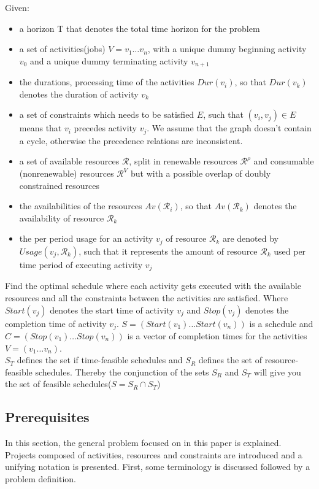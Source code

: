 \documentclass{article}
\begin{document}
Given:
\begin{itemize}
\item a horizon T that denotes the total time horizon for the problem
\item a set of activities(jobs) $V = v_1 \ldots v_n$, with a unique dummy beginning activity $v_0$ and a unique dummy terminating activity $v_{n+1}$
\item the durations, processing time of the activities $Dur(v_i)$, so that $Dur(v_k)$ denotes the duration of activity $v_k$
\item a set of constraints which needs to be satisfied $E$, such that $(v_i,v_j) \in E$ means that $v_i$ precedes activity $v_j$.
We assume that the graph doesn't contain a cycle, otherwise the precedence relations are inconsistent.
\item a set of available resources $\mathcal{R}$, split in renewable resources $\mathcal{R}^{\rho}$ and  consumable (nonrenewable) resources $\mathcal{R}^V$ but with a possible overlap of doubly constrained resources
\item the availabilities of the resources $Av(\mathcal{R}_i)$, so that $Av(\mathcal{R}_k)$ denotes the availability of resource $\mathcal{R}_k$
\item the per period usage for an activity $v_j$ of resource $\mathcal{R}_k$ are denoted by $Usage(v_j, \mathcal{R}_k)$, such that it represents the amount of resource $\mathcal{R}_k$ used per time period of executing activity $v_j$
\end{itemize}

Find the optimal schedule where each activity gets executed with the available resources and all the constraints between the activities are satisfied.
Where $Start(v_j)$ denotes the start time of activity $v_j$ and $Stop(v_j)$ denotes the completion time of activity $v_j$.
$S = (Start(v_1) \ldots Start(v_n))$ is a schedule and $C = (Stop(v_1) \ldots Stop(v_n))$ is a vector of completion times for the activities $V = (v_1 \ldots v_n)$.
\\
$S_T$ defines the set if time-feasible schedules and $S_R$ defines the set of resource-feasible schedules.
Thereby the conjunction of the sets $S_R$ and $S_T$ will give you the set of feasible schedules($S = S_R \cap S_T$)

\subsection{Prerequisites}
In this section, the general problem focused on in this paper is explained.
Projects composed of activities, resources and constraints are introduced and a unifying notation is presented.
First, some terminology is discussed followed by a problem definition.
\end{document}
